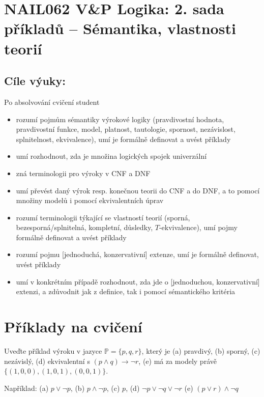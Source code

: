 \section*{NAIL062 V\&P Logika: 2. sada příkladů -- Sémantika, vlastnosti teorií}

\subsection*{Cíle výuky:} Po absolvování cvičení student

    \begin{itemize}\setlength{\itemsep}{0pt}
        \item rozumí pojmům sémantiky výrokové logiky (pravdivostní hodnota, pravdivostní funkce, model, platnost, tautologie, spornost, nezávislost, splnitelnost, ekvivalence), umí je formálně definovat a uvést příklady
        \item umí rozhodnout, zda je množina logických spojek univerzální
        \item zná terminologii pro výroky v CNF a DNF %
        \item umí převést daný výrok resp. konečnou teorii do CNF a do DNF, a to pomocí množiny modelů i pomocí ekvivalentních úprav
        \item rozumí terminologii týkající se vlastností teorií (sporná, bezesporná/splnitelná, kompletní, důsledky, $T$-ekvivalence), umí pojmy formálně definovat a uvést příklady
        \item rozumí pojmu [jednoduchá, konzervativní] extenze, umí je formálně definovat, uvést příklady
        \item umí v konkrétním případě rozhodnout, zda jde o [jednoduchou, konzervativní] extenzi, a zdůvodnit jak z definice, tak i pomocí sémantického kritéria
    \end{itemize}


\section*{Příklady na cvičení}


\begin{problem}

    Uveďte příklad výroku v jazyce $\mathbb P=\{p,q,r\}$, který je (a) pravdivý, (b) sporný, (c) nezávislý, (d) ekvivalentní s $(p\wedge q)\to\neg r$, (e) má za modely právě $\{(1,0,0),(1,0,1),(0,0,1)\}$.


    \begin{solution}
        Například: (a) $p\lor\neg p$, (b) $p\land\neg p$, (c) $p$, (d) $\neg p\lor\neg q\lor\neg r$ (e) $(p\lor r)\land\neg q$            
    \end{solution}

\end{problem}


